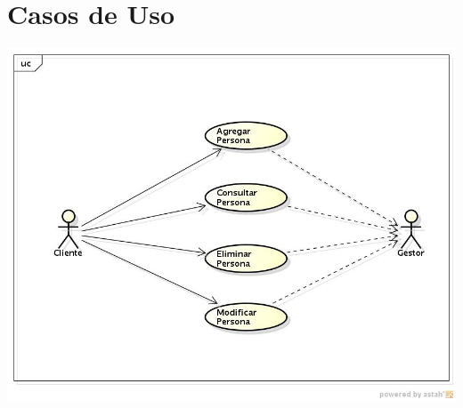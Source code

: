 \documentclass[11pt]{article}
\begin{document}
\section{Casos de Uso}


\begin{center}
\includegraphics[scale=0.65]{CasosUsoCliente} 
\end{center}

\end{document}
